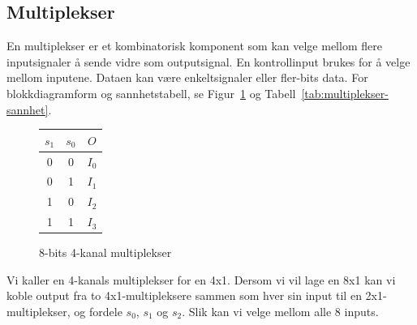 \documentclass[12pt,a4paper,norsk]{article}
\begin{document}
\subsection{Multiplekser}
En multiplekser er et kombinatorisk komponent som kan velge mellom flere inputsignaler å sende
vidre som outputsignal. En kontrollinput brukes for å velge mellom inputene. 
Dataen kan være enkeltsignaler eller fler-bits data. For blokkdiagramform og sannhetstabell, se
Figur~\ref{fig:multiplekser-blokk} og Tabell~\ref{tab:multiplekser-sannhet}.
\begin{figure}[hbt!]
  \centering
  \begin{minipage}{0.6\textwidth}
    \centering
    \caption{8-bits 4-kanal multiplekser\label{fig:multiplekser-blokk}}
  \end{minipage}
  \begin{minipage}{0.3\textwidth}
    \centering
    \begin{tabular}{cc|c}
      \toprule
      $s_1$ & $s_0$ & $O$ \\
      \midrule
      0 & 0 & $I_0$ \\
      0 & 1 & $I_1$ \\
      1 & 0 & $I_2$ \\
      1 & 1 & $I_3$ \\
      \bottomrule
    \end{tabular}
  \end{minipage}
\end{figure}

Vi kaller en 4-kanals multiplekser for en 4x1. Dersom vi vil lage en
8x1 kan vi koble output fra to 4x1-multipleksere sammen som hver sin
input til en 2x1-multiplekser, og fordele $s_0$, $s_1$ og $s_2$. Slik
kan vi velge mellom alle 8 inputs.
\end{document}
